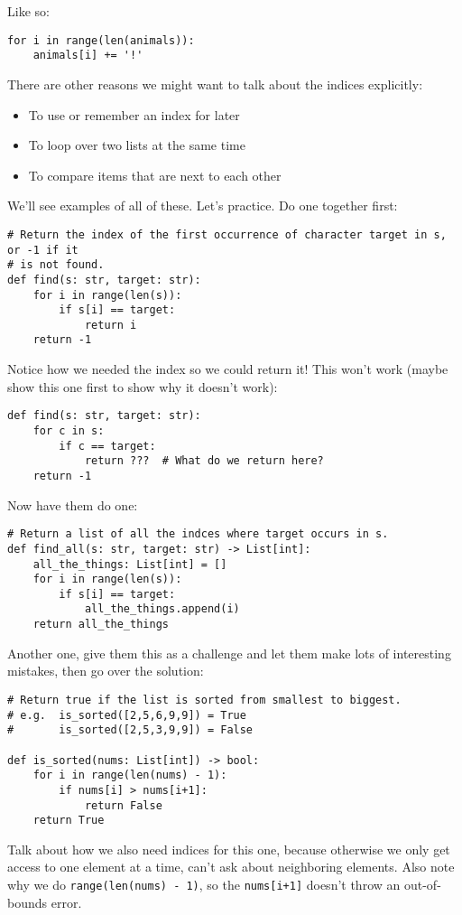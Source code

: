 \documentclass{article}
\begin{document}
Like so:
\begin{verbatim}
for i in range(len(animals)):
    animals[i] += '!'
\end{verbatim}

There are other reasons we might want to talk about the indices
explicitly:
\begin{itemize}
\item To use or remember an index for later
\item To loop over two lists at the same time
\item To compare items that are next to each other
\end{itemize}

We'll see examples of all of these.  Let's practice.  Do one together first:
\begin{verbatim}
# Return the index of the first occurrence of character target in s, or -1 if it
# is not found.
def find(s: str, target: str):
    for i in range(len(s)):
        if s[i] == target:
            return i
    return -1
\end{verbatim}
Notice how we needed the index so we could return it!  This won't
work (maybe show this one first to show why it doesn't work):
\begin{verbatim}
def find(s: str, target: str):
    for c in s:
        if c == target:
            return ???  # What do we return here?
    return -1
\end{verbatim}

Now have them do one:
\begin{verbatim}
# Return a list of all the indces where target occurs in s.
def find_all(s: str, target: str) -> List[int]:
    all_the_things: List[int] = []
    for i in range(len(s)):
        if s[i] == target:
            all_the_things.append(i)
    return all_the_things
\end{verbatim}

Another one, give them this as a challenge and let them make lots of
interesting mistakes, then go over the solution:
\begin{verbatim}
# Return true if the list is sorted from smallest to biggest.
# e.g.  is_sorted([2,5,6,9,9]) = True
#       is_sorted([2,5,3,9,9]) = False

def is_sorted(nums: List[int]) -> bool:
    for i in range(len(nums) - 1):
        if nums[i] > nums[i+1]:
            return False
    return True
\end{verbatim}

Talk about how we also need indices for this one, because otherwise we
only get access to one element at a time, can't ask about neighboring
elements.  Also note why we do \verb|range(len(nums) - 1)|, so the
\verb|nums[i+1]| doesn't throw an out-of-bounds error.
\end{document}
